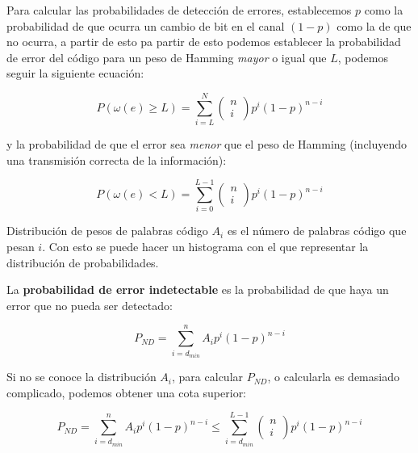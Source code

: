 \documentclass{article}
\begin{document}
Para calcular las probabilidades de detección de errores, establecemos $p$ como la probabilidad de que ocurra un cambio de bit en el canal $(1-p)$ como la de que no ocurra, a partir de esto pa partir de esto podemos establecer la probabilidad de error del código para un peso de Hamming \textit{mayor} o igual que $L$, podemos seguir la siguiente ecuación:

\begin{equation}
    P(\omega (e) \geq L ) = \sum_{i=L}^{N}
    \left(\begin{array}{c}
        n \\
        i    
    \end{array}\right)
    p^i(1-p)^{n-i}
\end{equation}

\pagebreak

y la probabilidad de que el error sea \textit{menor} que el peso de Hamming (incluyendo una transmisión correcta de la información):

\begin{equation}
    P(\omega (e) < L ) = \sum_{i=0}^{L-1}
    \left(\begin{array}{c}
        n \\
        i    
    \end{array}\right)
    p^i(1-p)^{n-i}
\end{equation}

Distribución de pesos de palabras código $A_i$ es el número de palabras código que pesan $i$. Con esto se puede hacer un histograma con el que representar la distribución de probabilidades.

La \textbf{probabilidad de error indetectable} es la probabilidad de que haya un error que no pueda ser detectado:

\begin{equation}
    P_{ND} = \sum_{i=d_{min}}^{n}A_ip^i(1-p)^{n-i}
\end{equation}

Si no se conoce la distribución $A_i$, para calcular $P_{ND}$, o calcularla es demasiado complicado, podemos obtener una cota superior:

\begin{equation}
    P_{ND} = \sum_{i=d_{min}}^{n}A_ip^i(1-p)^{n-i} \leq \sum_{i=d_{min}}^{L-1}
    \left(\begin{array}{c}
        n \\
        i    
    \end{array}\right)
    p^i(1-p)^{n-i}
\end{equation}
\end{document}

